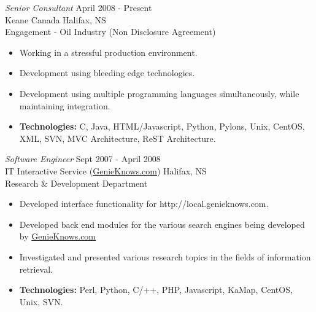 \documentclass[line,margin]{res}
\begin{document}
\begin{resume}
   {\sl Senior Consultant} \hfill April 2008 - Present \\
    Keane Canada \hfill Halifax, NS \\
    Engagement - Oil Industry (Non Disclosure Agreement) \smallskip
    \begin{itemize}  \itemsep -2pt %
     \item Working in a stressful production environment.
     \item Development using bleeding edge technologies.
     \item Development using multiple programming languages
            simultaneously, while \\ maintaining integration.
     \item {\bf Technologies:} \hspace{1pt}
        C, Java, HTML/Javascript, Python, Pylons, Unix, CentOS, \newline
        \hspace*{72pt} XML, SVN, MVC Architecture, ReST Architecture.
    \end{itemize}

   {\sl Software Engineer} \hfill Sept 2007 - April 2008 \\
    IT Interactive Service (\href{http://www.genieknows.com}{GenieKnows.com}) \hfill Halifax, NS \\
    Research {\&} Development Department \smallskip
    \begin{itemize}  \itemsep -2pt %
     \item Developed interface functionality for
             http://local.genieknows.com.
     \item Developed back end modules for the various search
             engines being developed by
             \href{http://www.genieknows.com}{GenieKnows.com}
     \item Investigated and presented various research topics
             in the fields of information retrieval.
     \item {\bf Technologies:} \hspace{1pt}
        Perl, Python, C/++, PHP, Javascript, KaMap, CentOS, \\
        \hspace*{72pt} Unix, SVN.
    \end{itemize}


\end{resume}
\end{document}
